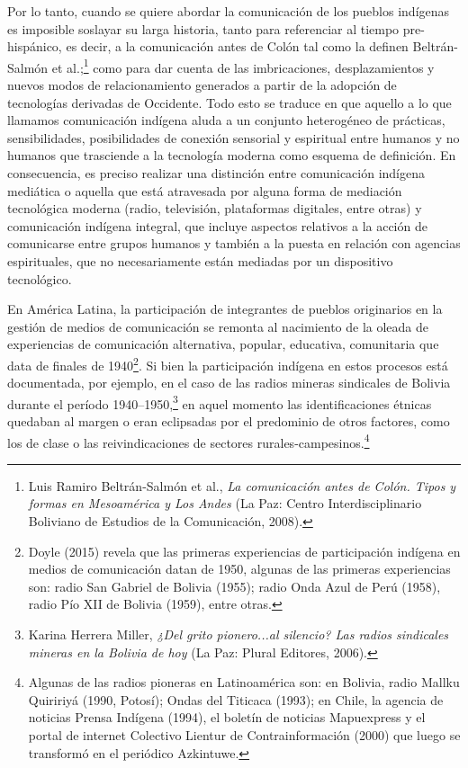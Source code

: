 \documentclass{tufte-handout}
\begin{document}
Por lo tanto, cuando se quiere abordar la comunicación de los pueblos
indígenas es imposible soslayar su larga historia, tanto para
referenciar al tiempo pre-hispánico, es decir, a la comunicación antes
de Colón tal como la definen Beltrán-Salmón et al.;\footnote{Luis Ramiro
  Beltrán-Salmón et al., \emph{La comunicación antes de Colón. Tipos y
  formas en Mesoamérica y Los Andes} (La Paz: Centro Interdisciplinario
  Boliviano de Estudios de la Comunicación, 2008).} como para dar cuenta
de las imbricaciones, desplazamientos y nuevos modos de relacionamiento
generados a partir de la adopción de tecnologías derivadas de Occidente.
Todo esto se traduce en que aquello a lo que llamamos comunicación
indígena aluda a un conjunto heterogéneo de prácticas, sensibilidades,
posibilidades de conexión sensorial y espiritual entre humanos y no
humanos que trasciende a la tecnología moderna como esquema de
definición. En consecuencia, es preciso realizar una distinción entre
comunicación indígena mediática o aquella que está atravesada por alguna
forma de mediación tecnológica moderna (radio, televisión, plataformas
digitales, entre otras) y comunicación indígena integral, que incluye
aspectos relativos a la acción de comunicarse entre grupos humanos y
también a la puesta en relación con agencias espirituales, que no
necesariamente están mediadas por un dispositivo tecnológico.

En América Latina, la participación de integrantes de pueblos
originarios en la gestión de medios de comunicación se remonta al
nacimiento de la oleada de experiencias de comunicación alternativa,
popular, educativa, comunitaria que data de finales de 1940\footnote{Doyle
  (2015) revela que las primeras experiencias de participación indígena
  en medios de comunicación datan de 1950, algunas de las primeras
  experiencias son: radio San Gabriel de Bolivia (1955); radio Onda Azul
  de Perú (1958), radio Pío XII de Bolivia (1959), entre otras.}. Si
bien la participación indígena en estos procesos está documentada, por
ejemplo, en el caso de las radios mineras sindicales de Bolivia durante
el período 1940--1950,\footnote{Karina Herrera Miller, \emph{¿Del grito
  pionero...al silencio? Las radios sindicales mineras en la Bolivia de
  hoy} (La Paz: Plural Editores, 2006).} en aquel momento las
identificaciones étnicas quedaban al margen o eran eclipsadas por el
predominio de otros factores, como los de clase o las reivindicaciones
de sectores rurales-campesinos.\footnote{Algunas de las radios pioneras
  en Latinoamérica son: en Bolivia, radio Mallku Quiririyá (1990,
  Potosí); Ondas del Titicaca (1993); en Chile, la agencia de noticias
  Prensa Indígena (1994), el boletín de noticias Mapuexpress y el portal
  de internet Colectivo Lientur de Contrainformación (2000) que luego se
  transformó en el periódico Azkintuwe.}
\end{document}
